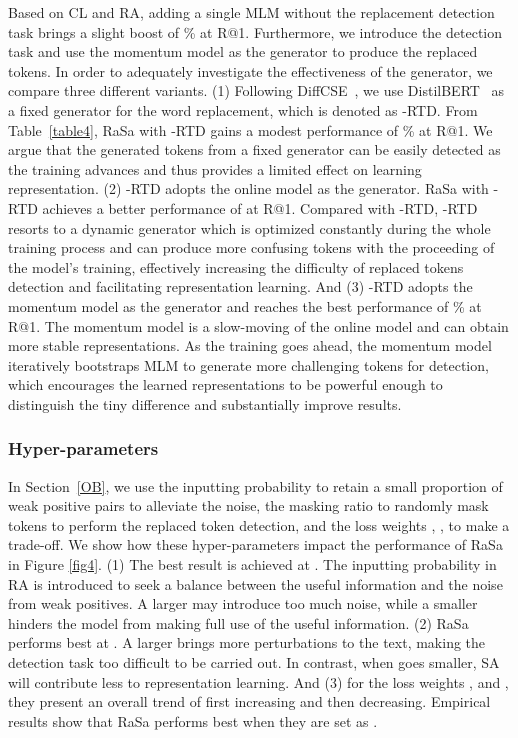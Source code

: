 \documentclass{article}
\begin{document}
Based on CL and RA, adding a single MLM without the replacement detection task brings a slight boost of \% at R@1.
Furthermore, we introduce the detection task and use the momentum model as the generator to produce the replaced tokens.
In order to adequately investigate the effectiveness of the generator, we compare three different variants.
(1) Following DiffCSE~\cite{chuang2022diffcse}, we use DistilBERT~\cite{sanh2019distilbert} as a fixed generator for the word replacement, which is denoted as -RTD. 
From Table~\ref{table4}, RaSa with -RTD gains a modest performance of \% at R@1. 
We argue that the generated tokens from a fixed generator can be easily detected as the training advances and thus provides a limited effect on learning representation. 
(2) -RTD adopts the online model as the generator. 
RaSa with -RTD achieves a better performance of  at R@1. 
Compared with -RTD, -RTD resorts to a dynamic generator which is optimized constantly during the whole training process and can produce more confusing tokens with the proceeding of the model's training, effectively increasing the difficulty of replaced tokens detection and facilitating representation learning.
And (3) -RTD adopts the momentum model as the generator and reaches the best performance of \% at R@1. The momentum model is a slow-moving of the online model and can obtain more stable representations. 
As the training goes ahead, the momentum model iteratively bootstraps MLM to generate more challenging tokens for detection, which encourages the learned representations to be powerful enough to distinguish the tiny difference and substantially improve results.


\subsubsection{Hyper-parameters}
In Section~\ref{OB}, we use the inputting probability  to retain a small proportion of weak positive pairs to alleviate the noise, the masking ratio  to randomly mask tokens to perform the replaced token detection, and the loss weights , ,  to make a trade-off. 
We show how these hyper-parameters impact the performance of RaSa in Figure \ref{fig4}.
(1) The best result is achieved at . The inputting probability  in RA is introduced to seek a balance between the useful information and the noise from weak positives. A larger  may introduce too much noise, while a smaller  hinders the model from making full use of the useful information. 
(2) RaSa performs best at . A larger  brings more perturbations to the text, making the detection task too difficult to be carried out. In contrast, when  goes smaller, SA will contribute less to representation learning. 
And (3) for the loss weights ,  and , they present an overall trend of first increasing and then decreasing. Empirical results show that RaSa performs best when they are set as .
\end{document}
